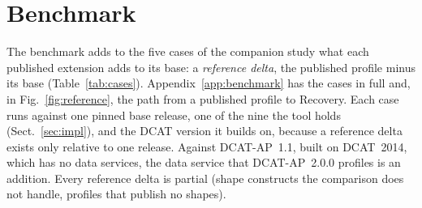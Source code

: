 \section{Benchmark}\label{sec:benchmark}

The benchmark adds to the five cases of the companion study \cite{anon2027rq1} what each published extension adds
to its base: a \emph{reference delta}, the published profile minus its base (Table~\ref{tab:cases}). %
Appendix~\ref{app:benchmark} has the cases in full and, in Fig.~\ref{fig:reference}, the path from a published
profile to Recovery. Each case runs against one pinned base release, one of the nine the tool holds
(Sect.~\ref{sec:impl}), and the \ac{DCAT} version it builds on, because a reference delta exists only relative to
one release. %
Against \ac{DCAT-AP}~1.1, built on DCAT~2014, which has no data services, the data service that \ac{DCAT-AP}~2.0.0
profiles is an addition. %
 Every reference delta is partial (shape constructs the comparison
does not handle, profiles that publish no shapes).

